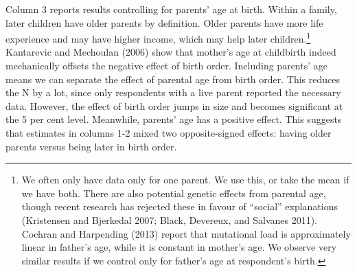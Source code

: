 \documentclass[
  12pt,
]{article}
\theoremstyle{definition}
\theoremstyle{definition}
\theoremstyle{definition}
\theoremstyle{definition}
\theoremstyle{remark}
\begin{document}
Column 3 reports results controlling for parents' age at birth. Within a family,
later children have older parents by definition. Older parents have more life
experience and may have higher income, which may help later children.\footnote{We often only have data only for one parent. We use this, or take the mean
  if we have both. There are also potential genetic effects from parental age,
  though recent research has rejected these in favour of ``social'' explanations
  (Kristensen and Bjerkedal 2007; Black, Devereux, and Salvanes 2011). Cochran and Harpending (2013) report that
  mutational load is approximately linear in father's age, while it is constant in
  mother's age. We observe very similar results if we control only for father's
  age at respondent's birth.}
Kantarevic and Mechoulan (2006) show that mother's age at childbirth indeed mechanically
offsets the negative effect of birth order. Including parents' age means we can
separate the effect of parental age from birth order. This reduces the N by a
lot, since only respondents with a live parent reported the necessary data.
However, the effect of birth order jumps in size and becomes significant at the
5 per cent level. Meanwhile, parents' age has a positive effect. This suggests
that estimates in columns 1-2 mixed two opposite-signed effects: having older
parents versus being later in birth order.

 
  \providecommand{\huxb}[2]{\arrayrulecolor[RGB]{#1}\global\arrayrulewidth=#2pt}
  \providecommand{\huxvb}[2]{\color[RGB]{#1}\vrule width #2pt}
  \providecommand{\huxtpad}[1]{\rule{0pt}{#1}}
  \providecommand{\huxbpad}[1]{\rule[-#1]{0pt}{#1}}
\end{document}
